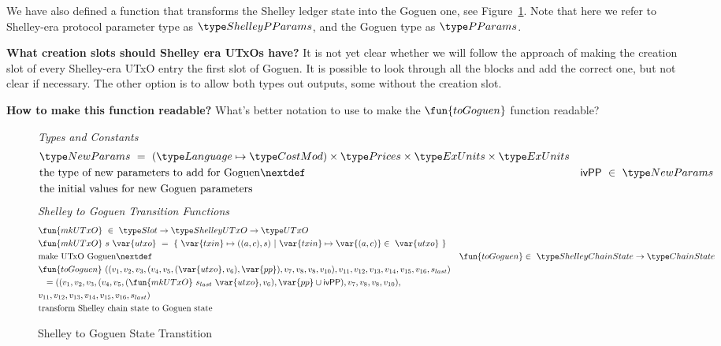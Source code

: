 We have also defined a function that transforms the Shelley ledger state into
the Goguen one, see Figure~\ref{fig:functions:to-shelley}. Note that here we
refer to Shelley-era protocol parameter type as $\ShelleyPParams$, and the Goguen
type as $\PParams$.

\begin{note}
  \textbf{What creation slots should Shelley era UTxOs have?}
  It is not yet clear whether we will follow the approach of making the creation
  slot of every Shelley-era UTxO entry the first slot of Goguen. It is possible
  to look through all the blocks and add the correct one, but not clear if
  necessary. The other option is to allow both types out outputs, some without
  the creation slot.
\end{note}


\begin{note}
  \textbf{How to make this function readable?}
  What's better notation to use to make the $\fun{toGoguen}$ function readable?
\end{note}
\begin{figure}[htb]
  \emph{Types and Constants}
  \begin{align*}
      & \NewParams ~=~ (\Language \mapsto \CostMod) \times \Prices \times \ExUnits \times \ExUnits \\
      & \text{the type of new parameters to add for Goguen}
      \nextdef
      & \mathsf{ivPP} ~\in~ \NewParams \\
      & \text{the initial values for new Goguen parameters}
  \end{align*}
  \emph{Shelley to Goguen Transition Functions}
  \begin{align*}
      & \fun{mkUTxO} ~\in~ \Slot \to \ShelleyUTxO  \to \UTxO  \\
      & \fun{mkUTxO}~s~\var{utxo} ~=~ \{~ \var{txin} \mapsto ((a,c),s) ~\vert~
      \var{txin} \mapsto \var{(a,c)}\in ~\var{utxo}~\} \\
      & \text{make UTxO Goguen}
      \nextdef
      & \fun{toGoguen} \in ~ \ShelleyChainState \to \ChainState \\
      & \fun{toGoguen}~((v_1, v_2, v_3, (v_4, v_5, (\var{utxo}, v_6), \var{pp}),
      v_7, v_8, v_8, v_{10}), v_{11}, v_{12}, v_{13}, v_{14}, v_{15}, v_{16}, s_{last}) \\
      & ~~ = ((v_1, v_2, v_3, (v_4, v_5, (\fun{mkUTxO}~s_{last}~\var{utxo}, v_6),
       \var{pp}\cup \mathsf{ivPP}),
      v_7, v_8, v_8, v_{10}), \\
      & v_{11}, v_{12}, v_{13}, v_{14}, v_{15}, v_{16}, s_{last}) \\
      & \text{transform Shelley chain state to Goguen state}
  \end{align*}
  \caption{Shelley to Goguen State Transtition}
  \label{fig:functions:to-shelley}
\end{figure}

